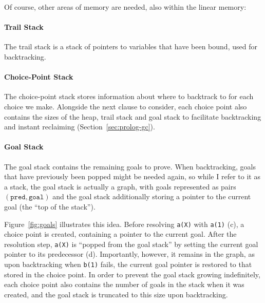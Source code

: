 Of course, other areas of memory are needed, also within the linear memory:

\paragraph{Trail Stack} The trail stack is a stack of pointers to variables that have been bound, used for backtracking.

\paragraph{Choice-Point Stack} The choice-point stack stores information about where to backtrack to for each choice we make. Alongside the next clause to consider, each choice point also contains the sizes of the heap, trail stack and goal stack to facilitate backtracking and instant reclaiming (Section~\ref{sec:prolog-gc}).

\paragraph{Goal Stack} The goal stack contains the remaining goals to prove. When backtracking, goals that have previously been popped might be needed again, so while I refer to it as a stack, the goal stack is actually a graph, with goals represented as pairs $(\texttt{pred}, \texttt{goal})$ and the goal stack additionally storing a pointer to the current goal (the ``top of the stack'').

Figure~\ref{fig:goals} illustrates this idea. Before resolving \texttt{a(X)} with \texttt{a(1)} (c), a choice point is created, containing a pointer to the current goal. After the resolution step, \texttt{a(X)} is ``popped from the goal stack'' by setting the current goal pointer to its predecessor (d). Importantly, however, it remains in the graph, as upon backtracking when \texttt{b(1)} fails, the current goal pointer is restored to that stored in the choice point. In order to prevent the goal stack growing indefinitely, each choice point also contains the number of goals in the stack when it was created, and the goal stack is truncated to this size upon backtracking.

